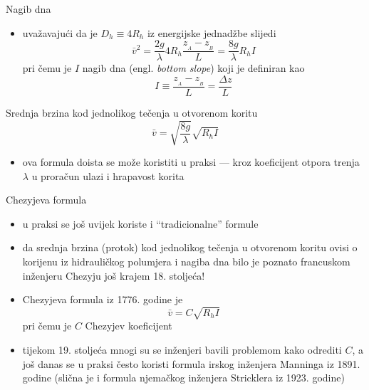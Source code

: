 \documentclass{beamer}
\begin{document}
\begin{frame}{Nagib dna}

\begin{itemize}
\item uvažavajući da je $D_{h}\equiv4R_{h}$ iz energijske jednadžbe slijedi
\[
\bar{v}^{2}=\frac{2g}{\lambda}4R_{h}\frac{z_{_{A}}-z_{_{B}}}{L}=\frac{8g}{\lambda}R_{h}I
\]
pri čemu je $I$ \alert{nagib dna} (engl. \emph{bottom slope}) koji
je definiran kao
\[
I\equiv\frac{z_{_{A}}-z_{_{B}}}{L}=\frac{\Delta z}{L}
\]
\end{itemize}
\begin{block}{Srednja brzina kod jednolikog tečenja u otvorenom koritu}
\[
\bar{v}=\sqrt{\frac{8g}{\lambda}}\sqrt{R_{h}I}
\]
\end{block}
\begin{itemize}
\item ova formula doista se može koristiti u praksi --- kroz koeficijent
otpora trenja $\lambda$ u proračun ulazi i hrapavost korita
\end{itemize}
\end{frame}

\begin{frame}{Chezyjeva formula}

\begin{itemize}
\item u praksi se još uvijek koriste i ``tradicionalne'' formule
\item da srednja brzina (protok) kod jednolikog tečenja u otvorenom koritu
ovisi o korijenu iz hidrauličkog polumjera i nagiba dna bilo je poznato
francuskom inženjeru Chezyju još krajem 18. stoljeća!
\item \alert{Chezyjeva formula} iz 1776. godine je
\[
\bar{v}=C\sqrt{R_{h}I}
\]
pri čemu je $C$ Chezyjev koeficijent
\item tijekom 19. stoljeća mnogi su se inženjeri bavili problemom kako odrediti
$C$, a još danas se u praksi često koristi formula irskog inženjera
Manninga iz 1891. godine (slična je i formula njemačkog inženjera
Stricklera iz 1923. godine)
\end{itemize}
\end{frame}
\end{document}
